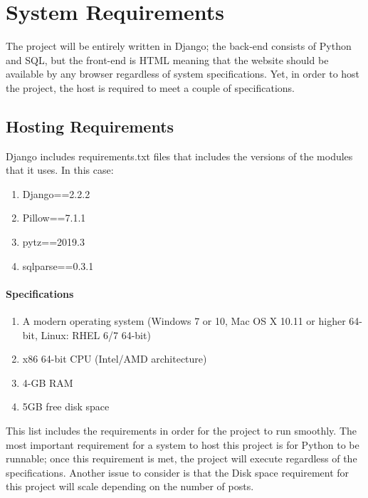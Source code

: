 \section{System Requirements}

The project will be entirely written in Django; the back-end consists of Python and SQL, but the front-end is HTML meaning that the website should be available by any browser regardless of system specifications. Yet, in order to host the project, the host is required to meet a couple of specifications.

\subsection{Hosting Requirements}

Django includes requirements.txt files that includes the versions of the modules that it uses. In this case:

\begin{enumerate}
  \item Django==2.2.2
  \item Pillow==7.1.1
  \item pytz==2019.3
  \item sqlparse==0.3.1
\end{enumerate}

\paragraph{Specifications}

\begin{enumerate}
  \item A modern operating system (Windows 7 or 10, Mac OS X 10.11 or higher 64-bit, Linux: RHEL 6/7 64-bit)
  \item x86 64-bit CPU (Intel/AMD architecture)
  \item 4-GB RAM
  \item 5GB free disk space
\end{enumerate}

This list includes the requirements in order for the project to run smoothly. The most important requirement for a system to host this project is for Python to be runnable; once this requirement is met, the project will execute regardless of the specifications. Another issue to consider is that the Disk space requirement for this project will scale depending on the number of posts.

